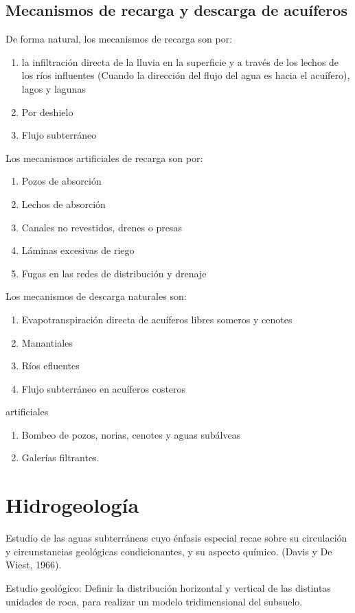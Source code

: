 \subsection{Mecanismos de recarga y descarga de acuíferos}
De forma natural, los mecanismos de recarga son por:
\begin{enumerate}
    \item la infiltración directa de la lluvia en la superficie y a través de los lechos de los ríos influentes (Cuando la dirección del flujo del agua es hacia el acuífero), lagos y lagunas
    \item Por deshielo
    \item Flujo subterráneo
\end{enumerate}
Los mecanismos artificiales de recarga son por:
\begin{enumerate}
    \item Pozos de absorción
    \item Lechos de absorción
    \item Canales no revestidos, drenes o presas
    \item Láminas excesivas de riego
    \item Fugas en las redes de distribución y drenaje
\end{enumerate}
Los mecanismos de descarga naturales son:
\begin{enumerate}
    \item Evapotranspiración directa de acuíferos libres someros y cenotes
    \item Manantiales
    \item Ríos efluentes
    \item Flujo subterráneo en acuíferos costeros
\end{enumerate}
artificiales
\begin{enumerate}
    \item Bombeo de pozos, norias, cenotes y aguas subálveas
    \item Galerías filtrantes.
\end{enumerate}
\section{Hidrogeología}
\begin{definition}[Hidrogeología]
    Estudio de las aguas subterráneas cuyo énfasis especial recae sobre su circulación y circunstancias geológicas condicionantes, y su aspecto químico. (Davis y De Wiest, 1966). 
\end{definition}
Estudio geológico: Definir la distribución horizontal y vertical de las distintas unidades de roca, para realizar un modelo tridimensional del subsuelo.

